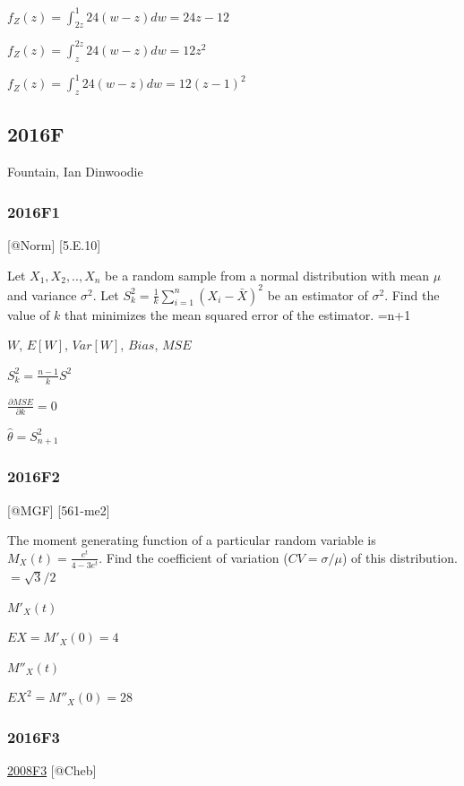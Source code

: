 \documentclass[6pt,Portrait]{article}
\begin{document}
 \(f_{Z}(z)=\int_{2z}^{1}24(w-z)dw=24z-12\)

 \(f_{Z}(z)=\int_{z}^{2z}24(w-z)dw=12z^2\)

{ \(f_{Z}(z)=\int_{z}^{1}24(w-z)dw=12(z-1)^2\) }

\hypertarget{f-11}{%
\subsection{2016F}\label{f-11}}

Fountain, Ian Dinwoodie

\hypertarget{f1-6}{%
\subsubsection{2016F1}\label{f1-6}}

{[}@Norm{]} {[}5.E.10{]}

Let \(X_1,X_2,..,X_n\) be a random sample from a normal distribution
with mean \(\mu\) and variance \(\sigma^2\). Let
\(S_k^2=\frac1k\sum_{i=1}^n(X_i-\bar X)^2\) be an estimator of
\(\sigma^2\). Find the value of \(k\) that minimizes the mean squared
error of the estimator. =n+1

\(W\), \(E[W]\), \(Var[W]\), \(Bias\), \(MSE\)

\(S_k^2=\frac{n-1}{k}S^2\)

\(\frac{\partial MSE}{\partial k}=0\)

\(\hat\theta=S_{n+1}^2\)

\hypertarget{f2-6}{%
\subsubsection{2016F2}\label{f2-6}}

{[}@MGF{]} {[}561-me2{]}

The moment generating function of a particular random variable is
\(M_X(t)=\frac{e^t}{4-3e^t}\). Find the coefficient of variation
(\(CV=\sigma/\mu\)) of this distribution. \(=\sqrt3/2\)

\(M'_X(t)\)

\(EX=M'_X(0)=4\)

\(M''_X(t)\)

\(EX^2=M''_X(0)=28\)

\hypertarget{f3-6}{%
\subsubsection{2016F3}\label{f3-6}}

\protect\hyperlink{f3-3}{2008F3} {[}@Cheb{]}
\end{document}

